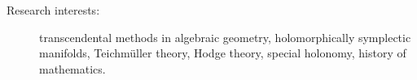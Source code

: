 \documentclass{article}
\begin{document}
\begin{description}
\item[Research interests:] transcendental methods in algebraic geometry, 
holomorphically symplectic manifolds, Teichm\"uller theory, Hodge theory, 
special holonomy, history of mathematics.


\end{description}
\end{document}
